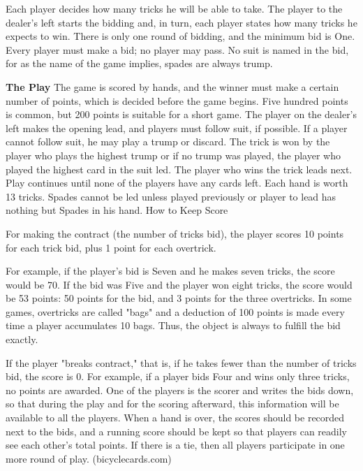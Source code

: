 \documentclass[journal, a4paper]{Spades_Logic_Dependency/IEEEtran}
\begin{document}
Each player decides how many tricks he will be able to take. The player to the dealer's left starts the bidding and, in turn, each player states how many tricks he expects to win. There is only one round of bidding, and the minimum bid is One. Every player must make a bid; no player may pass. No suit is named in the bid, for as the name of the game implies, spades are always trump.\newline

\textbf{The Play}\newline
The game is scored by hands, and the winner must make a certain number of points, which is decided before the game begins. Five hundred points is common, but 200 points is suitable for a short game. The player on the dealer's left makes the opening lead, and players must follow suit, if possible. If a player cannot follow suit, he may play a trump or discard. The trick is won by the player who plays the highest trump or if no trump was played, the player who played the highest card in the suit led. The player who wins the trick leads next. Play continues until none of the players have any cards left. Each hand is worth 13 tricks. Spades cannot be led unless played previously or player to lead has nothing but Spades in his hand.
How to Keep Score

For making the contract (the number of tricks bid), the player scores 10 points for each trick bid, plus 1 point for each overtrick.

For example, if the player's bid is Seven and he makes seven tricks, the score would be 70. If the bid was Five and the player won eight tricks, the score would be 53 points: 50 points for the bid, and 3 points for the three overtricks. In some games, overtricks are called "bags" and a deduction of 100 points is made every time a player accumulates 10 bags. Thus, the object is always to fulfill the bid exactly.

If the player "breaks contract," that is, if he takes fewer than the number of tricks bid, the score is 0. For example, if a player bids Four and wins only three tricks, no points are awarded.
One of the players is the scorer and writes the bids down, so that during the play and for the scoring afterward, this information will be available to all the players. When a hand is over, the scores should be recorded next to the bids, and a running score should be kept so that players can readily see each other's total points. If there is a tie, then all players participate in one more round of play. (bicyclecards.com)
\end{document}
